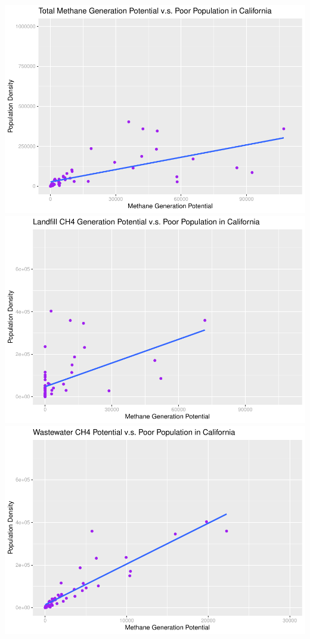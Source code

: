\documentclass[
  12pt,
]{article}
\begin{document}
\includegraphics{FDR_ProjectReport_files/figure-latex/unnamed-chunk-8-1.pdf}
\includegraphics{FDR_ProjectReport_files/figure-latex/unnamed-chunk-8-2.pdf}
\includegraphics{FDR_ProjectReport_files/figure-latex/unnamed-chunk-8-3.pdf}
\end{document}
